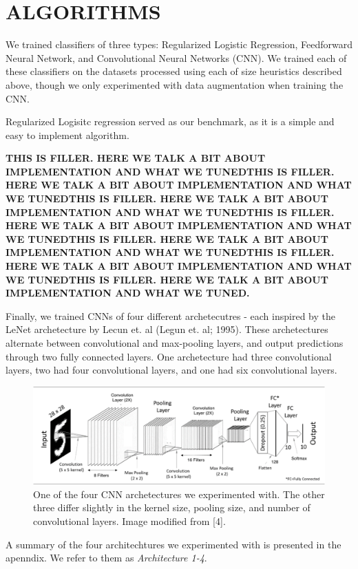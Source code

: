 \documentclass[letterpaper, 10 pt, conference]{ieeeconf}  %
\begin{document}
\section{ALGORITHMS}

We trained classifiers of three types: Regularized Logistic Regression, Feedforward Neural Network, and Convolutional Neural Networks (CNN). We trained each of these classifiers on the datasets processed using each of size heuristics described above, though we only experimented with data augmentation when training the CNN.

Regularized Logisitc regression served as our benchmark, as it is a simple and easy to implement algorithm. 

\textbf{THIS IS FILLER. HERE WE TALK A BIT ABOUT IMPLEMENTATION AND WHAT WE TUNEDTHIS IS FILLER. HERE WE TALK A BIT ABOUT IMPLEMENTATION AND WHAT WE TUNEDTHIS IS FILLER. HERE WE TALK A BIT ABOUT IMPLEMENTATION AND WHAT WE TUNEDTHIS IS FILLER. HERE WE TALK A BIT ABOUT IMPLEMENTATION AND WHAT WE TUNEDTHIS IS FILLER. HERE WE TALK A BIT ABOUT IMPLEMENTATION AND WHAT WE TUNEDTHIS IS FILLER. HERE WE TALK A BIT ABOUT IMPLEMENTATION AND WHAT WE TUNEDTHIS IS FILLER. HERE WE TALK A BIT ABOUT IMPLEMENTATION AND WHAT WE TUNED.}

Finally, we trained CNNs of four different archetecutres - each inspired by the LeNet archetecture by Lecun et. al (Legun et. al; 1995). These archetectures alternate between convolutional and max-pooling layers, and output predictions through two fully connected layers. One archetecture had three convolutional layers, two had four convolutional layers, and one had six convolutional layers. 
\begin{figure}[H]
      \centering
      \includegraphics[scale = .42]{conv4_arch}
		\centering
      \caption{One of the four CNN archetectures we experimented with. The other three differ slightly in the kernel size, pooling size, and number of convolutional layers. Image modified from [4]. }
      \label{figurelabel}
\end{figure}
A summary of the four architechtures we experimented with is presented in the apenndix. We refer to them as \emph{Architecture 1-4}. 
\end{document}
